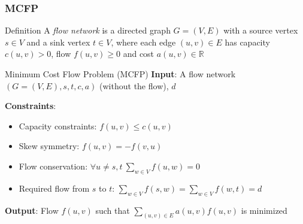 \documentclass{beamer}
\begin{document}
\begin{frame}
\frametitle{MCFP}

\begin{block}{Definition}
A {\it flow network} is a directed graph $G = (V, E)$ with a source vertex $s \in V$ and a sink vertex $t \in V$,
where each edge $(u, v) \in E$ has capacity $c(u, v) > 0$, flow $f(u, v) \geq 0$ and cost $a(u, v) \in \mathbb{R}$

\end{block}

\begin{block}{Minimum Cost Flow Problem (MCFP)}
{\bf Input}: A flow network $(G = (V, E), s, t, c, a)$ (without the flow), $d$

{\bf Constraints}:
\begin{itemize}
	\item Capacity constraints: $f(u, v) \leq c(u, v)$
	\item Skew symmetry: $f(u, v) = -f(v, u)$
	\item Flow conservation: $\forall u \not= s, t \ \sum_{w \in V} f(u, w) = 0$
	\item Required flow from $s$ to $t$: $\sum_{w \in V} f(s, w) = \sum_{w \in V} f(w, t) = d$
\end{itemize}

{\bf Output}: Flow $f(u, v)$ such that $\sum_{(u, v) \in E} a(u, v) f(u, v)$ is minimized

\end{block}

\end{frame}

\end{document}

